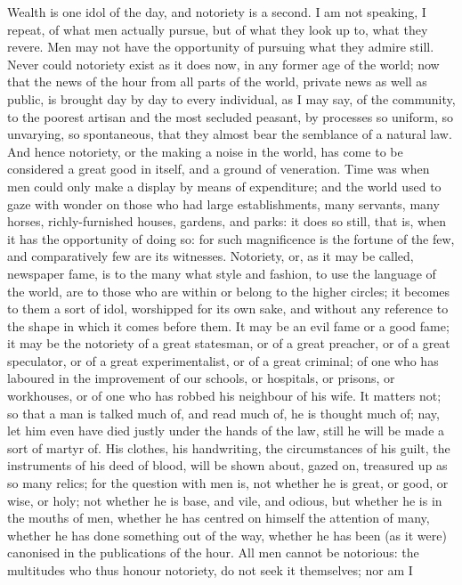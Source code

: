 Wealth is one idol of the day, and notoriety is a second. I am not
speaking, I repeat, of what men actually pursue, but of what they look
up to, what they revere. Men may not have the opportunity of pursuing
what they admire still. Never could notoriety exist as it does now, in
any former age of the world; now that the news of the hour from all
parts of the world, private news as well as public, is brought day by
day to every individual, as I may say, of the community, to the
poorest artisan and the most secluded peasant, by processes so
uniform, so unvarying, so spontaneous, that they almost bear the
semblance of a natural law. And hence notoriety, or the making a noise
in the world, has come to be considered a great good in itself, and a
ground of veneration. Time was when men could only make a display by
means of expenditure; and the world used to gaze with wonder on those
who had large establishments, many servants, many horses,
richly-furnished houses, gardens, and parks: it does so still, that
is, when it has the opportunity of doing so: for such magnificence is
the fortune of the few, and comparatively few are its witnesses. Notoriety, or, as it may be called, newspaper fame, is to the many
what style and fashion, to use the language of the world, are to those
who are within or belong to the higher circles; it becomes to them a
sort of idol, worshipped for its own sake, and without any reference
to the shape in which it comes before them. It may be an evil fame or
a good fame; it may be the notoriety of a great statesman, or of a
great preacher, or of a great speculator, or of a great
experimentalist, or of a great criminal; of one who has laboured in
the improvement of our schools, or hospitals, or prisons, or
workhouses, or of one who has robbed his neighbour of his wife. It
matters not; so that a man is talked much of, and read much of, he is
thought much of; nay, let him even have died justly under the hands of
the law, still he will be made a sort of martyr of. His clothes, his
handwriting, the circumstances of his guilt, the instruments of his
deed of blood, will be shown about, gazed on, treasured up as so many
relics; for the question with men is, not whether he is great, or
good, or wise, or holy; not whether he is base, and vile, and odious,
but whether he is in the mouths of men, whether he has centred on
himself the attention of many, whether he has done something out of
the way, whether he has been (as it were) canonised in the
publications of the hour. All men cannot be notorious: the multitudes
who thus honour notoriety, do not seek it themselves; nor am I
